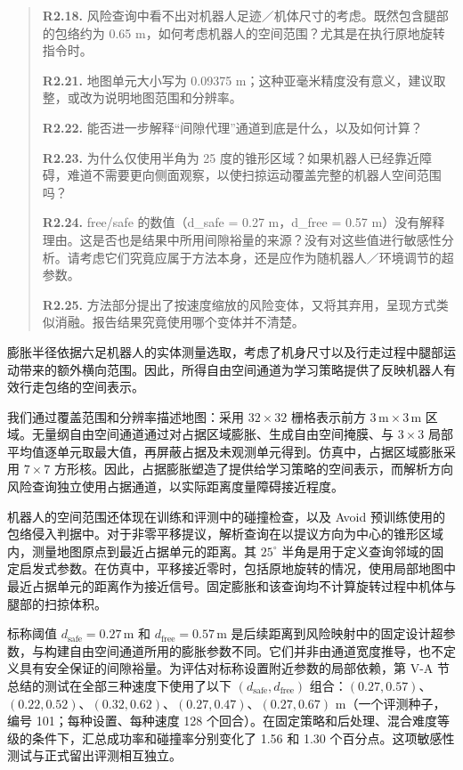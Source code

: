 \begin{quote}
\textbf{R2.18.} 风险查询中看不出对机器人足迹／机体尺寸的考虑。既然包含腿部的包络约为 0.65 m，如何考虑机器人的空间范围？尤其是在执行原地旋转指令时。

\textbf{R2.21.} 地图单元大小写为 0.09375 m；这种亚毫米精度没有意义，建议取整，或改为说明地图范围和分辨率。

\textbf{R2.22.} 能否进一步解释“间隙代理”通道到底是什么，以及如何计算？

\textbf{R2.23.} 为什么仅使用半角为 25 度的锥形区域？如果机器人已经靠近障碍，难道不需要更向侧面观察，以使扫掠运动覆盖完整的机器人空间范围吗？

\textbf{R2.24.} free/safe 的数值（d\_safe = 0.27 m，d\_free = 0.57 m）没有解释理由。这是否也是结果中所用间隙裕量的来源？没有对这些值进行敏感性分析。请考虑它们究竟应属于方法本身，还是应作为随机器人／环境调节的超参数。

\textbf{R2.25.} 方法部分提出了按速度缩放的风险变体，又将其弃用，呈现方式类似消融。报告结果究竟使用哪个变体并不清楚。
\end{quote}
\response
膨胀半径依据六足机器人的实体测量选取，考虑了机身尺寸以及行走过程中腿部运动带来的额外横向范围。因此，所得自由空间通道为学习策略提供了反映机器人有效行走包络的空间表示。

我们通过覆盖范围和分辨率描述地图：采用 $32\times32$ 栅格表示前方 $3\,\mathrm{m}\times3\,\mathrm{m}$ 区域。无量纲自由空间通道通过对占据区域膨胀、生成自由空间掩膜、与 $3\times3$ 局部平均值逐单元取最大值，再屏蔽占据及未观测单元得到。仿真中，占据区域膨胀采用 $7\times7$ 方形核。因此，占据膨胀塑造了提供给学习策略的空间表示，而解析方向风险查询独立使用占据通道，以实际距离度量障碍接近程度。

机器人的空间范围还体现在训练和评测中的碰撞检查，以及 Avoid 预训练使用的包络侵入判据中。对于非零平移提议，解析查询在以提议方向为中心的锥形区域内，测量地图原点到最近占据单元的距离。其 $25^\circ$ 半角是用于定义查询邻域的固定启发式参数。在仿真中，平移接近零时，包括原地旋转的情况，使用局部地图中最近占据单元的距离作为接近信号。固定膨胀和该查询均不计算旋转过程中机体与腿部的扫掠体积。

标称阈值 $d_{\mathrm{safe}}=0.27\,\mathrm{m}$ 和 $d_{\mathrm{free}}=0.57\,\mathrm{m}$ 是后续距离到风险映射中的固定设计超参数，与构建自由空间通道所用的膨胀参数不同。它们并非由通道宽度推导，也不定义具有安全保证的间隙裕量。为评估对标称设置附近参数的局部依赖，第 V-A 节总结的测试在全部三种速度下使用了以下 $(d_{\mathrm{safe}},d_{\mathrm{free}})$ 组合：$(0.27,0.57)$、$(0.22,0.52)$、$(0.32,0.62)$、$(0.27,0.47)$、$(0.27,0.67)$ m（一个评测种子，编号 101；每种设置、每种速度 128 个回合）。在固定策略和后处理、混合难度等级的条件下，汇总成功率和碰撞率分别变化了 1.56 和 1.30 个百分点。这项敏感性测试与正式留出评测相互独立。

